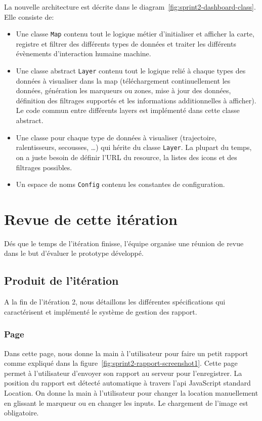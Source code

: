 La nouvelle architecture est décrite dans le
diagram~\ref{fig:sprint2-dashboard-class}. Elle consiste de:

\begin{itemize}
    \item Une classe \verb|Map| contenu tout le logique métier d'initialiser et
        afficher la carte, registre et filtrer des différents types de données
        et traiter les différents évènements d'interaction humaine machine.
    \item Une classe abstract \verb|Layer| contenu tout le logique relié à
        chaque types des données à visualiser dans la map (téléchargement
        continuellement les données, génération les marqueurs ou zones, mise à
        jour des données, définition des filtrages supportés et les
        informations additionnelles à afficher). Le code commun entre
        différents layers est implémenté dans cette classe abstract.
    \item Une classe pour chaque type de données à visualiser (trajectoire,
        ralentisseurs, secousses, \ldots) qui hérite du classe \verb|Layer|. La
        plupart du temps, on a juste besoin de définir l'URL du resource, la
        listes des icons et des filtrages possibles.
    \item Un espace de noms \verb|Config| contenu les constantes de
        configuration.
\end{itemize}

\section{Revue de cette itération}


Dés que le temps de l'itération finisse, l'équipe organise une réunion de revue dans
le but d'évaluer le prototype développé.

\subsection{Produit de l'itération}

A la fin de l'itération 2, nous détaillons les différentes spécifications qui
caractérisent et implémenté le système de gestion des rapport.

\subsubsection{Page }

Dans cette page, nous donne la main à l'utilisateur pour faire un petit rapport
comme expliqué dans la figure~\ref{fig:sprint2-rapport-screenshot1}. Cette page
permet à l'utilisateur d'envoyer son rapport au serveur pour l'enregistrer. La
position du rapport est détecté automatique à travers l'api JavaScript standard
Location. On donne la main à l'utilisateur pour changer la location
manuellement en glissant le marqueur ou en changer les inputs. Le chargement de
l'image est obligatoire.

